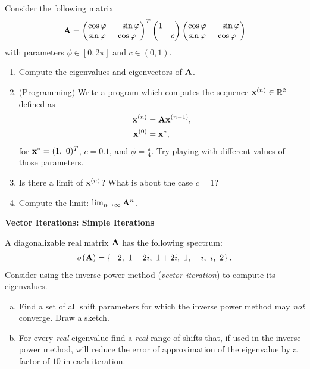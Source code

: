 \begin{Sheet}
  \begin{Problem}
  	Consider the following matrix
  	\begin{gather*}
  	\mathbf A =
  	\begin{pmatrix}
  	\cos\varphi & -\sin\varphi\\
  	\sin\varphi &  \cos\varphi
  	\end{pmatrix}^T
  	\begin{pmatrix}
  	1 & \\
  	& c
  	\end{pmatrix}
  	\begin{pmatrix}
  	\cos\varphi & -\sin\varphi\\
  	\sin\varphi &  \cos\varphi
  	\end{pmatrix}
  	\end{gather*}
  	with parameters $\phi\in[0,2\pi]$ and $c\in(0,1)$.
  	\begin{enumerate}
  		\item Compute the eigenvalues and eigenvectors of $\mathbf A$.
  		\item (Programming) Write a program which computes the sequence
  		$\mathbf x^{(n)}\in\mathbb R^2$ defined as
  		\begin{align*}
  		\mathbf x^{(n)} &= \mathbf A \mathbf x^{(n-1)}, \\
  		\mathbf x^{(0)} &= \mathbf x^{*},
  		\end{align*}
  		for $\vx^{*} = (1,\ 0)^T$, $c = 0.1$, and
  		$\phi=\frac\pi4$. Try playing with different values of those
  		parameters.
  		\item Is there a limit of $\mathbf x^{(n)}$? What is about the case
  		$c=1$?
  		\item Compute the limit: $\lim_{n\to\infty}\mathbf A^n$.
  	\end{enumerate}
  \end{Problem}

  \textbf{Vector Iterations: Simple Iterations}

  \begin{Problem}
    A diagonalizable real matrix $\mathbf A$ has the following spectrum:
    \begin{gather*}
      \sigma(\mathbf A) = \left\{-2,\ 1-2i,\ 1+2i,\ 1,\ -i,\ i,\ 2\right\}.
    \end{gather*}
    Consider using the inverse power method (\textit{vector
      iteration}) to compute its eigenvalues.
    \begin{enumerate}[(a)]
    \item Find a set of all shift parameters for which the inverse
      power method may \textit{not} converge. Draw a sketch.
    \item For every \textit{real} eigenvalue find a \textit{real}
      range of shifts that, if used in the inverse power method, will
      reduce the error of approximation of the eigenvalue by a factor
      of $10$ in each iteration.
    \end{enumerate}
  \end{Problem}


\end{Sheet}
